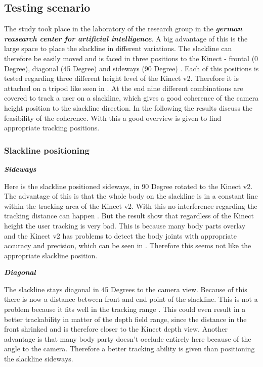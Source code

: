 \subsection{Testing scenario}

The study took place in the laboratory of the research group in the \textit{\textbf{german reasearch center for artificial intelligence}}. A big advantage of this is the large space to place the slackline in different variations. The slackline can therefore be easily moved and is faced in three positions to the Kinect - frontal (0 Degree), diagonal (45 Degree) and sideways (90 Degree) \textbf{}. Each of this positions is tested regarding three different height level of the Kinect v2. Therefore it is attached on a tripod like seen in \textbf{}. At the end nine different combinations are covered to track a user on a slackline, which gives a good coherence of the camera height position to the slackline direction. In the following the results discuss the feasibility of the coherence. With this a good overview is given to find appropriate tracking positions.

\subsubsection{Slackline positioning}
\textit{\textbf{Sideways}}


Here is the slackline positioned sideways, in 90 Degree rotated to the Kinect v2. The advantage of this is that the whole body on the slackline is in a constant line within the tracking area of the Kinect v2. With this no interference regarding the tracking distance can happen \textbf{}. But the result show that regardless of the Kinect height the user tracking is very bad. This is because many body parts overlay and the Kinect v2 has problems to detect the body joints with appropriate accuracy and precision, which can be seen in \textbf{}. Therefore this seems not like the appropriate slackline position.

\textit{\textbf{Diagonal}}

The slackline stays diagonal in 45 Degrees to the camera view. Because of this there is now a distance between front and end point of the slackline. This is not a problem because it fits well in the tracking range \textbf{}. This could even result in a better trackability in matter of the depth field range, since the distance in the front shrinked and is therefore closer to the Kinect depth view. Another advantage is that many body party doesn't occlude entirely here because of the angle to the camera. Therefore a better tracking ability is given than positioning the slackline sideways.

